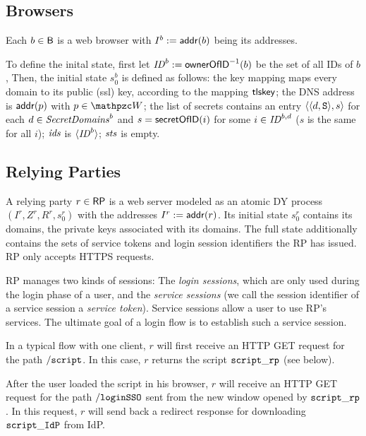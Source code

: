 \documentclass[letterpaper,onecolumn,10pt]{article}
\begin{document}
\subsection{Browsers}\label{app:browsers-uppresso} 
Each $b \in \mathsf{B}$ is a web browser with 
$I^b := \mathsf{addr}(b)$ being its addresses.

To define the inital state, first let $\mathit{ID}^b := 
\mathsf{ownerOfID}^{-1}(b)$ be the set of all IDs of $b$, 
Then, the initial state $s_0^b$ is defined as follows: the key mapping
maps every domain to its public (ssl) key, according to the mapping
$\mathsf{tlskey}$; the DNS address is $\mathsf{addr}(p)$ with $p \in \bidsystem$;
the list of secrets contains an entry $\langle\langle d,\mathtt{S}\rangle, s\rangle$ for each
$d \in \mathit{SecretDomains}^b$ and $s = \mathsf{secretOfID}(i)$ for some $i \in
\mathit{ID}^{b,d}$ ($s$ is the same for all $i$); $\mathit{ids}$ is
$\langle\mathit{ID}^b\rangle$; $\mathit{sts}$ is empty.

\subsection{Relying Parties} \label{app:relying-parties-uppresso}

A relying party $r \in \mathsf{RP}$ is a web server modeled as an atomic
DY process $(I^r, Z^r, R^r, s^r_0)$ with the addresses $I^r :=
\mathsf{addr}(r)$. Its initial state $s^r_0$ contains its domains,
the private keys associated with its domains.
The full state additionally contains the sets of service tokens and login 
session identifiers the RP has issued. RP only accepts HTTPS requests.

RP manages two kinds of sessions: The \emph{login sessions}, which are
only used during the login phase of a user, and the \emph{service
  sessions} (we call the session identifier of a service session a
\emph{service token}). Service sessions allow a user to use RP's
services. The ultimate goal of a login flow is to establish such a
service session.

In a typical flow with one client, $r$ will first receive an HTTP GET
request for the path $\mathtt{/script}$. In this case, $r$ returns the script
$\mathtt{script\_rp}$ (see below).

After the user loaded the script in his browser, $r$ will receive an 
HTTP GET request for the path $\mathtt{/loginSSO}$ sent from the new window opened
by $\mathtt{script\_rp}$. In this request, $r$ will send back a redirect response  
for downloading $\mathtt{script\_IdP}$ from IdP.
\end{document}
